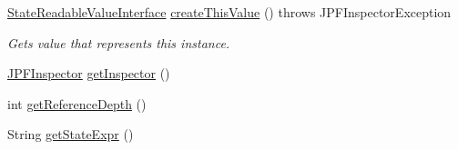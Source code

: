 \begin{DoxyCompactItemize}
\item 
\hyperlink{interfacegov_1_1nasa_1_1jpf_1_1inspector_1_1server_1_1programstate_1_1_state_readable_value_interface}{State\+Readable\+Value\+Interface} \hyperlink{classgov_1_1nasa_1_1jpf_1_1inspector_1_1server_1_1programstate_1_1_state_element_info_affcbbe448d62d41659dd946e1cf07ffc}{create\+This\+Value} ()  throws J\+P\+F\+Inspector\+Exception 
\begin{DoxyCompactList}\small\item\em Gets value that represents this instance. \end{DoxyCompactList}\item 
\hyperlink{classgov_1_1nasa_1_1jpf_1_1inspector_1_1server_1_1jpf_1_1_j_p_f_inspector}{J\+P\+F\+Inspector} \hyperlink{classgov_1_1nasa_1_1jpf_1_1inspector_1_1server_1_1programstate_1_1_state_node_af07846313e0632df18008b5bf571f805}{get\+Inspector} ()
\item 
int \hyperlink{classgov_1_1nasa_1_1jpf_1_1inspector_1_1server_1_1programstate_1_1_state_node_af59b1ac0319251e657293c810a16cdd9}{get\+Reference\+Depth} ()
\item 
String \hyperlink{classgov_1_1nasa_1_1jpf_1_1inspector_1_1server_1_1programstate_1_1_state_node_a54c1c8d91f93c078171589f844252bdf}{get\+State\+Expr} ()
\end{DoxyCompactItemize}
